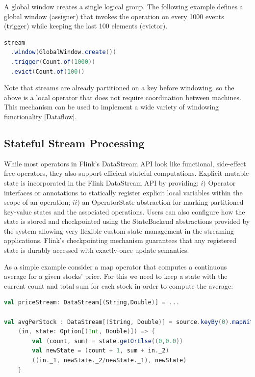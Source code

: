 A global window creates a single logical group. The following example defines a global window (assigner) that invokes the operation on every 1000 events (trigger) while keeping the last 100 elements (evictor). 

\begin{lstlisting}[language=Scala]
stream
  .window(GlobalWindow.create())
  .trigger(Count.of(1000))
  .evict(Count.of(100))
\end{lstlisting}

Note that streams are already partitioned on a key before windowing, so the above is a local operator that does not require coordination between machines. This mechanism can be used to implement a wide variety of windowing functionality [Dataflow]. 

\subsection{Stateful Stream Processing}
While most operators in Flink’s DataStream API look like functional, side-effect free operators, they also support efficient stateful computations. Explicit mutable state is incorporated in the Flink DataStream API by providing: $i)$ Operator interfaces or annotations to statically register explicit local variables within the scope of an operation;  $ii)$ an OperatorState abstraction for marking partitioned key-value states and the associated operations. Users can also configure how the state is stored and checkpointed using the StateBackend abstractions provided by the system allowing very flexible custom state management in the streaming applications. Flink’s checkpointing mechanism guarantees that any registered state is durably accessed with exactly-once update semantics. 

As a simple example consider a map operator that computes a continuous average for a given stocks' price. For this we need to keep a state with the current count and total sum for each stock in order to compute the average:

\begin{lstlisting}[language=Scala]
val priceStream: DataStream[(String,Double)] = ...
 
val avgPerStock : DataStream[(String, Double)] = source.keyBy(0).mapWithState(
    (in, state: Option[(Int, Double)]) => {
		val (count, sum) = state.getOrElse((0,0.0))
		val newState = (count + 1, sum + in._2)
		((in._1, newState._2/newState._1), newState)
	}
\end{lstlisting}

